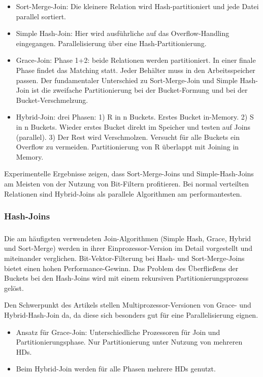 \documentclass[a4paper,12pt,twoside]{article}
\begin{document}
\begin{itemize}
	\item Sort-Merge-Join: Die kleinere Relation wird Hash-partitioniert und jede Datei parallel sortiert. 
	\item Simple Hash-Join: Hier wird ausführliche auf das Overflow-Handling eingegangen. Parallelisierung über eine Hash-Partitionierung.
	\item Grace-Join: Phase 1+2: beide Relationen werden partitioniert. In einer finale Phase findet das Matching statt. Jeder Behälter muss in den Arbeitsspeicher passen. Der fundamentaler Unterschied zu Sort-Merge-Join und Simple Hash-Join ist die zweifache Partitionierung bei der Bucket-Formung und bei der Bucket-Verschmelzung.
	\item Hybrid-Join: drei Phasen: 1) R in n Buckets. Erstes Bucket in-Memory. 2) S in n Buckets. Wieder erstes Bucket direkt im Speicher und testen auf Joins (parallel). 3) Der Rest wird Verschmolzen. Versucht für alle Buckets ein Overflow zu vermeiden. Partitionierung von R überlappt mit Joining in Memory.
\end{itemize}

Experimentelle Ergebnisse zeigen, dass Sort-Merge-Joins und Simple-Hash-Joins am Meisten von der Nutzung von Bit-Filtern profitieren. Bei normal verteilten Relationen sind Hybrid-Joins als parallele Algorithmen am performantesten. 

\subsubsection{Hash-Joins}

\subsubsection*{}

Die am häufigsten verwendeten Join-Algorithmen (Simple Hash, Grace, Hybrid und Sort-Merge) werden in ihrer Einprozessor-Version im Detail vorgestellt und miteinander verglichen. Bit-Vektor-Filterung bei Hash- und Sort-Merge-Joins bietet einen hohen Performance-Gewinn. Das Problem des Überfließens der Buckets bei den Hash-Joins wird mit einem rekursiven Partitionierungsprozess gelöst. 

Den Schwerpunkt des Artikels stellen Multiprozessor-Versionen von Grace- und Hybrid-Hash-Join da, da diese sich besonders gut für eine Parallelisierung eignen.

\begin{itemize}
	\item Ansatz für Grace-Join: Unterschiedliche Prozessoren für Join und Partitionierungsphase. Nur Partitionierung unter Nutzung von mehreren HDs.
	\item Beim Hybrid-Join werden für alle Phasen mehrere HDs genutzt.
\end{itemize}
\end{document}
